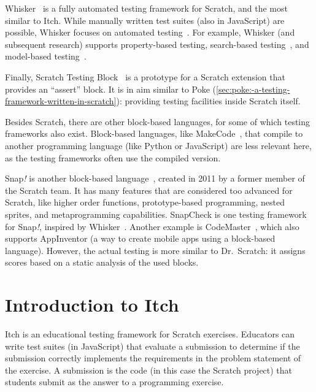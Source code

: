 \documentclass[../main]{subfiles}
\begin{document}
Whisker~\autocite{stahlbauerTestingScratchPrograms2019} is a fully automated testing framework for Scratch, and the most similar to Itch.
While manually written test suites (also in JavaScript) are possible, Whisker focuses on automated testing~\autocite{deinerAutomatedTestGeneration2023}.
For example, Whisker (and subsequent research) supports property-based testing, search-based testing~\autocite{deinerSearchBasedTestingScratch2020}, and model-based testing~\autocite{gotzModelbasedTestingScratch2022}.

Finally, Scratch Testing Block~\autocite{nurueTestingExtensionScratch2024} is a prototype for a Scratch extension that provides an ``assert'' block.
It is in aim similar to Poke (\cref{sec:poke:-a-testing-framework-written-in-scratch}): providing testing facilities inside Scratch itself.

Besides Scratch, there are other block-based languages, for some of which testing frameworks also exist.
Block-based languages, like MakeCode~\autocite{ballMicrosoftMakeCodeEmbedded2019}, that compile to another programming language (like Python or JavaScript) are less relevant here, as the testing frameworks often use the compiled version.

Snap\textit{!} is another block-based language~\autocite{monigSnapBuildYour2024}, created in 2011 by a former member of the Scratch team.
It has many features that are considered too advanced for Scratch, like higher order functions, prototype-based programming, nested sprites, and metaprogramming capabilities.
SnapCheck is one testing framework for Snap\textit{!}, inspired by Whisker~\autocite{wangSnapCheckAutomatedTesting2021}.
Another example is CodeMaster~\autocite{wangenheimCodeMasterAutomaticAssessment2018}, which also supports AppInventor (a way to create mobile apps using a block-based language).
However, the actual testing is more similar to Dr.\ Scratch: it assigns scores based on a static analysis of the used blocks.

\section{Introduction to Itch}\label{sec:introduction-to-itch}

Itch is an educational testing framework for Scratch exercises.
Educators can write test suites (in JavaScript) that evaluate a submission to determine if the submission correctly implements the requirements in the problem statement of the exercise.
A submission is the code (in this case the Scratch project) that students submit as the answer to a programming exercise.
\end{document}
